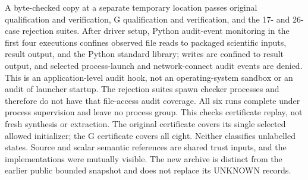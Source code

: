 A byte-checked copy at a separate temporary location passes original
qualification and verification, G qualification and verification,
and the 17- and 26-case rejection suites. After driver setup, Python
audit-event monitoring in the first four executions confines observed
file reads to packaged scientific inputs, result output, and the Python
standard library; writes are confined to result output, and selected
process-launch and network-connect audit events are denied. This is an application-level
audit hook, not an operating-system sandbox or an audit of launcher startup.
The rejection suites spawn checker processes and therefore do not have
that file-access audit coverage. All six runs complete under process
supervision and leave no process group. This checks certificate replay,
not fresh synthesis or extraction. The original certificate covers its
single selected allowed initializer; the G certificate covers all eight.
Neither classifies unlabelled states. Source and scalar semantic
references are shared trust inputs, and the implementations were
mutually visible. The new archive is distinct from the earlier
public bounded snapshot and does not replace its UNKNOWN records.
